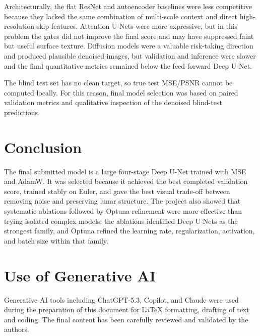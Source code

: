 \documentclass[a4paper,10pt]{article}
\begin{document}
Architecturally, the flat ResNet and autoencoder baselines were less competitive because they lacked the same combination of multi-scale context and direct high-resolution skip features. Attention U-Nets were more expressive, but in this problem the gates did not improve the final score and may have suppressed faint but useful surface texture. Diffusion models were a valuable risk-taking direction and produced plausible denoised images, but validation and inference were slower and the final quantitative metrics remained below the feed-forward Deep U-Net.

The blind test set has no clean target, so true test MSE/PSNR cannot be computed locally. For this reason, final model selection was based on paired validation metrics and qualitative inspection of the denoised blind-test predictions.

\section{Conclusion}
The final submitted model is a large four-stage Deep U-Net trained with MSE and AdamW. It was selected because it achieved the best completed validation score, trained stably on Euler, and gave the best visual trade-off between removing noise and preserving lunar structure. The project also showed that systematic ablations followed by Optuna refinement were more effective than trying isolated complex models: the ablations identified Deep U-Nets as the strongest family, and Optuna refined the learning rate, regularization, activation, and batch size within that family.
\section*{Use of Generative AI}

Generative AI tools including ChatGPT-5.3, Copilot, and Claude were used during the preparation of this document for LaTeX formatting, drafting of text and coding. The final content has been carefully reviewed and validated by the authors.
\end{document}
